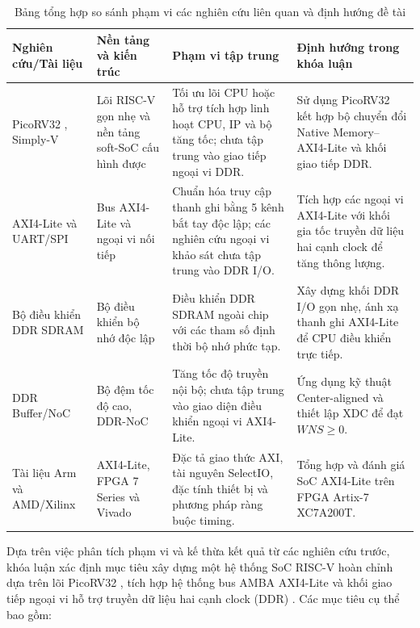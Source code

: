 \begin{table}[htbp]
\centering
\caption{Bảng tổng hợp so sánh phạm vi các nghiên cứu liên quan và định hướng đề tài}
\label{tab:literature-comparison}
\begin{tabular}{|>{\raggedright\arraybackslash}p{2.8cm}|>{\raggedright\arraybackslash}p{3.2cm}|>{\raggedright\arraybackslash}p{4.2cm}|>{\raggedright\arraybackslash}p{3.5cm}|}
\hline
\textbf{Nghiên cứu/Tài liệu} & \textbf{Nền tảng và kiến trúc} & \textbf{Phạm vi tập trung} & \textbf{Định hướng trong khóa luận} \\
\hline
PicoRV32 \cite{picorv32_repo}, Simply-V \cite{maisto2026simplyv} & Lõi RISC-V gọn nhẹ và nền tảng soft-SoC cấu hình được & Tối ưu lõi CPU hoặc hỗ trợ tích hợp linh hoạt CPU, IP và bộ tăng tốc; chưa tập trung vào giao tiếp ngoại vi DDR. & Sử dụng PicoRV32 kết hợp bộ chuyển đổi Native Memory--AXI4-Lite và khối giao tiếp DDR. \\
\hline
AXI4-Lite \cite{arm_axi4_spec,emil2023axiinterconnect} và UART/SPI \cite{huang2024uartcommunication,analog_spi_overview} & Bus AXI4-Lite và ngoại vi nối tiếp & Chuẩn hóa truy cập thanh ghi bằng 5 kênh bắt tay độc lập; các nghiên cứu ngoại vi khảo sát chưa tập trung vào DDR I/O. & Tích hợp các ngoại vi AXI4-Lite với khối gia tốc truyền dữ liệu hai cạnh clock để tăng thông lượng. \\
\hline
Bộ điều khiển DDR SDRAM \cite{shashikumar2010ahbddr,bonatto2008ddrinterface,naresh2016ddrcontroller} & Bộ điều khiển bộ nhớ độc lập & Điều khiển DDR SDRAM ngoài chip với các tham số định thời bộ nhớ phức tạp. & Xây dựng khối DDR I/O gọn nhẹ, ánh xạ thanh ghi AXI4-Lite để CPU điều khiển trực tiếp. \\
\hline
DDR Buffer/NoC \cite{ejaz2018ddrnoc,psarras2017nocddr,chisciotti2022ddrbuffer} & Bộ đệm tốc độ cao, DDR-NoC & Tăng tốc độ truyền nội bộ; chưa tập trung vào giao diện điều khiển ngoại vi AXI4-Lite. & Ứng dụng kỹ thuật Center-aligned và thiết lập XDC \cite{amd_ug903} để đạt $WNS \ge 0$. \\
\hline
Tài liệu Arm và AMD/Xilinx \cite{arm_axi4_spec,amd_ds180,amd_ds181,amd_ug471,amd_ug949,amd_ug903} & AXI4-Lite, FPGA 7 Series và Vivado & Đặc tả giao thức AXI, tài nguyên SelectIO, đặc tính thiết bị và phương pháp ràng buộc timing. & Tổng hợp và đánh giá SoC AXI4-Lite trên FPGA Artix-7 XC7A200T. \\
\hline
\end{tabular}
\end{table}

Dựa trên việc phân tích phạm vi và kế thừa kết quả từ các nghiên cứu trước, khóa luận xác định mục tiêu xây dựng một hệ thống SoC RISC-V hoàn chỉnh dựa trên lõi PicoRV32 \cite{picorv32_repo}, tích hợp hệ thống bus AMBA AXI4-Lite và khối giao tiếp ngoại vi hỗ trợ truyền dữ liệu hai cạnh clock (DDR) \cite{jedec_ddr}. Các mục tiêu cụ thể bao gồm:

